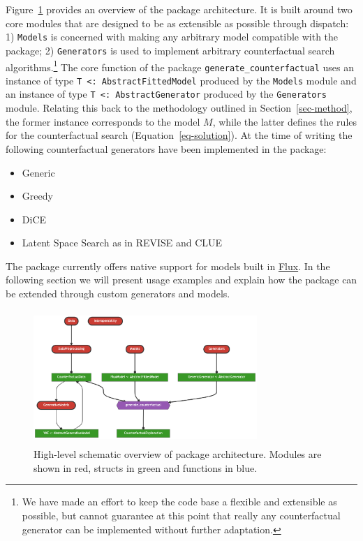 \documentclass[
  letterpaper,
  DIV=11,
  numbers=noendperiod]{scrartcl}
\begin{document}
Figure~\ref{fig-arch} provides an overview of the package architecture.
It is built around two core modules that are designed to be as
extensible as possible through dispatch: 1) \texttt{Models} is concerned
with making any arbitrary model compatible with the package; 2)
\texttt{Generators} is used to implement arbitrary counterfactual search
algorithms.\footnote{We have made an effort to keep the code base a
  flexible and extensible as possible, but cannot guarantee at this
  point that really any counterfactual generator can be implemented
  without further adaptation.} The core function of the package
\texttt{generate\_counterfactual} uses an instance of type
\texttt{T\ \textless{}:\ AbstractFittedModel} produced by the
\texttt{Models} module and an instance of type
\texttt{T\ \textless{}:\ AbstractGenerator} produced by the
\texttt{Generators} module. Relating this back to the methodology
outlined in Section~\ref{sec-method}, the former instance corresponds to
the model \(M\), while the latter defines the rules for the
counterfactual search (Equation~\ref{eq-solution}). At the time of
writing the following counterfactual generators have been implemented in
the package:

\begin{itemize}
\item Generic \cite{wachter2017counterfactual}
\item Greedy \cite{schut2021generating}
\item DiCE \cite{mothilal2020explaining}
\item Latent Space Search as in REVISE \cite{joshi2019realistic} and CLUE \cite{antoran2020getting}
\end{itemize}

The package currently offers native support for models built in
\href{https://fluxml.ai/}{Flux}. In the following section we will
present usage examples and explain how the package can be extended
through custom generators and models.

\begin{figure}

{\centering \includegraphics[width=3.33333in,height=2in]{www/pkg_architecture.png}

}

\caption{\label{fig-arch}High-level schematic overview of package
architecture. Modules are shown in red, structs in green and functions
in blue.}

\end{figure}
\end{document}
